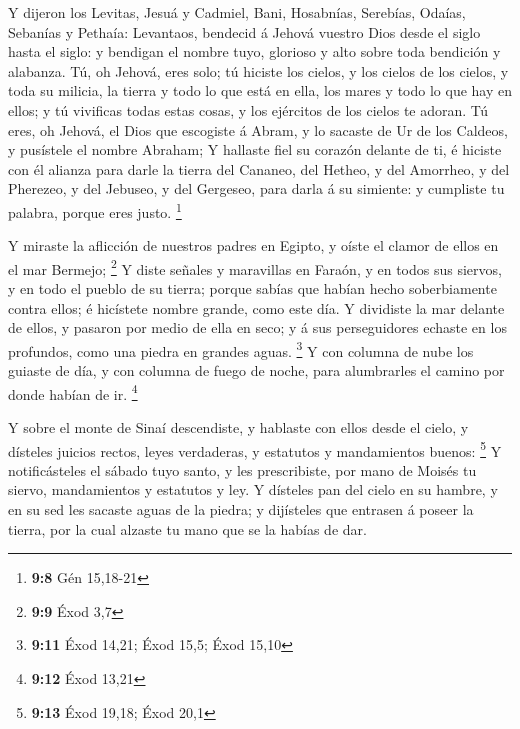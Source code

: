  Y dijeron los Levitas, Jesuá y Cadmiel, Bani, Hosabnías,
Serebías, Odaías, Sebanías y Pethaía: Levantaos, bendecid á Jehová
vuestro Dios desde el siglo hasta el siglo: y bendigan el nombre tuyo,
glorioso y alto sobre toda bendición y alabanza.  Tú, oh
Jehová, eres solo; tú hiciste los cielos, y los cielos de los cielos, y
toda su milicia, la tierra y todo lo que está en ella, los mares y todo
lo que hay en ellos; y tú vivificas todas estas cosas, y los ejércitos
de los cielos te adoran.  Tú eres, oh Jehová, el Dios que
escogiste á Abram, y lo sacaste de Ur de los Caldeos, y pusístele el
nombre Abraham;  Y hallaste fiel su corazón delante de ti,
é hiciste con él alianza para darle la tierra del Cananeo, del Hetheo, y
del Amorrheo, y del Pherezeo, y del Jebuseo, y del Gergeseo, para darla
á su simiente: y cumpliste tu palabra, porque eres justo. \footnote{\textbf{9:8}
  Gén 15,18-21}

 Y miraste la aflicción de nuestros padres en Egipto, y
oíste el clamor de ellos en el mar Bermejo; \footnote{\textbf{9:9} Éxod
  3,7}  Y diste señales y maravillas en Faraón, y en
todos sus siervos, y en todo el pueblo de su tierra; porque sabías que
habían hecho soberbiamente contra ellos; é hicístete nombre grande, como
este día.  Y dividiste la mar delante de ellos, y pasaron
por medio de ella en seco; y á sus perseguidores echaste en los
profundos, como una piedra en grandes aguas. \footnote{\textbf{9:11}
  Éxod 14,21; Éxod 15,5; Éxod 15,10}  Y con columna de
nube los guiaste de día, y con columna de fuego de noche, para
alumbrarles el camino por donde habían de ir. \footnote{\textbf{9:12}
  Éxod 13,21}

 Y sobre el monte de Sinaí descendiste, y hablaste con
ellos desde el cielo, y dísteles juicios rectos, leyes verdaderas, y
estatutos y mandamientos buenos: \footnote{\textbf{9:13} Éxod 19,18;
  Éxod 20,1}  Y notificásteles el sábado tuyo santo, y
les prescribiste, por mano de Moisés tu siervo, mandamientos y estatutos
y ley.  Y dísteles pan del cielo en su hambre, y en su
sed les sacaste aguas de la piedra; y dijísteles que entrasen á poseer
la tierra, por la cual alzaste tu mano que se la habías de dar.

